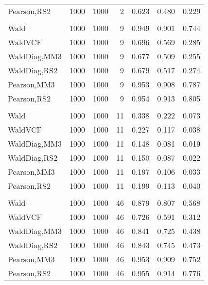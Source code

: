 \documentclass[
]{article}
\begin{document}
\begin{table}[H]
{\begin{tabular}[t]{lrrrrrr}
\hspace{1em}Pearson,RS2 & 1000 & 1000 & 2 & 0.623 & 0.480 & 0.229\\
\addlinespace[0.3em]
\multicolumn{7}{l}{\textbf{1F 15V}}\\
\hspace{1em}Wald & 1000 & 1000 & 9 & 0.949 & 0.901 & 0.744\\
\hspace{1em}WaldVCF & 1000 & 1000 & 9 & 0.696 & 0.569 & 0.285\\
\hspace{1em}WaldDiag,MM3 & 1000 & 1000 & 9 & 0.677 & 0.509 & 0.255\\
\hspace{1em}WaldDiag,RS2 & 1000 & 1000 & 9 & 0.679 & 0.517 & 0.274\\
\hspace{1em}Pearson,MM3 & 1000 & 1000 & 9 & 0.953 & 0.908 & 0.787\\
\hspace{1em}Pearson,RS2 & 1000 & 1000 & 9 & 0.954 & 0.913 & 0.805\\
\addlinespace[0.3em]
\multicolumn{7}{l}{\textbf{2F 10V}}\\
\hspace{1em}Wald & 1000 & 1000 & 11 & 0.338 & 0.222 & 0.073\\
\hspace{1em}WaldVCF & 1000 & 1000 & 11 & 0.227 & 0.117 & 0.038\\
\hspace{1em}WaldDiag,MM3 & 1000 & 1000 & 11 & 0.148 & 0.081 & 0.019\\
\hspace{1em}WaldDiag,RS2 & 1000 & 1000 & 11 & 0.150 & 0.087 & 0.022\\
\hspace{1em}Pearson,MM3 & 1000 & 1000 & 11 & 0.197 & 0.106 & 0.033\\
\hspace{1em}Pearson,RS2 & 1000 & 1000 & 11 & 0.199 & 0.113 & 0.040\\
\addlinespace[0.3em]
\multicolumn{7}{l}{\textbf{3F 15V}}\\
\hspace{1em}Wald & 1000 & 1000 & 46 & 0.879 & 0.807 & 0.568\\
\hspace{1em}WaldVCF & 1000 & 1000 & 46 & 0.726 & 0.591 & 0.312\\
\hspace{1em}WaldDiag,MM3 & 1000 & 1000 & 46 & 0.841 & 0.725 & 0.438\\
\hspace{1em}WaldDiag,RS2 & 1000 & 1000 & 46 & 0.843 & 0.745 & 0.473\\
\hspace{1em}Pearson,MM3 & 1000 & 1000 & 46 & 0.953 & 0.909 & 0.752\\
\hspace{1em}Pearson,RS2 & 1000 & 1000 & 46 & 0.955 & 0.914 & 0.776\\
\bottomrule
\end{tabular}}
\endgroup{}
\end{table}
\end{document}
